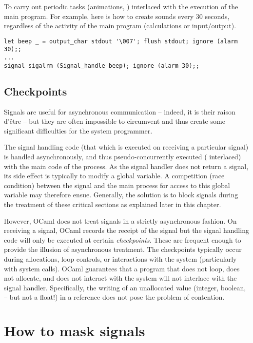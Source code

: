 \begin{example} 
To carry out periodic tasks (animations, \etc) interlaced with
the execution of the main program.  For example, here is how
to create  sounds every 30 seconds, regardless of
the activity of the main program (calculations or input/output).

\begin{lstlisting}
let beep _ = output_char stdout '\007'; flush stdout; ignore (alarm 30);;
...
signal sigalrm (Signal_handle beep); ignore (alarm 30);;
\end{lstlisting}
\end{example}

\subsection*{Checkpoints}

Signals are useful for asynchronous communication -- indeed, it is their 
raison d'\^etre -- but they are often impossible to 
circumvent and thus create some significant difficulties for the
system programmer.

The signal handling code (that which is executed on 
receiving a particular signal) is handled asynchronously, and thus 
pseudo-concurrently executed (\ie{} interlaced) with the main 
code of the process.  As the signal handler does not return
a signal, its side effect is typically to modify a global variable.
A competition (race condition) between the signal and the main process
for access to this global variable may therefore ensue.  Generally, the solution
is to block signals during the treatment of these critical sections as 
explained later in this chapter.  

However, OCaml does not treat signals in a strictly asynchronous
fashion.  On receiving a signal, OCaml records the receipt of the
signal but the signal handling code will only be executed at certain
\emph{checkpoints}.  These are frequent enough to provide the illusion of
asynchronous treatment.  The checkpoints typically occur during
allocations, loop controls, or interactions with the system
(particularly with system calls).  OCaml guarantees that a program
that does not loop, does not allocate, and does not interact with the
system will not interlace with the signal handler.  Specifically, the
writing of an unallocated value (integer, boolean, \etc{} -- but not a
float!) in a reference does not pose the problem of contention.

\section{How to mask signals}


